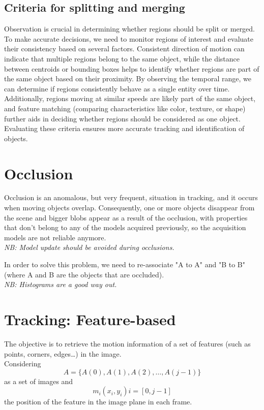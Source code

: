 \subsection{Criteria for splitting and merging}
Observation is crucial in determining whether regions should be split or merged. 
To make accurate decisions, we need to monitor regions of interest and evaluate their consistency based on several factors. 
Consistent direction of motion can indicate that multiple regions belong to the same object, while the distance between centroids or bounding boxes helps to identify whether regions are part of the same object based on their proximity. 
By observing the temporal range, we can determine if regions consistently behave as a single entity over time. 
Additionally, regions moving at similar speeds are likely part of the same object, and feature matching (comparing characteristics like color, texture, or shape) further aids in deciding whether regions should be considered as one object. 
Evaluating these criteria ensures more accurate tracking and identification of objects.

\section{Occlusion}
Occlusion is an anomalous, but very frequent, situation in tracking, and it occurs when moving objects overlap.
Consequently, one or more objects disappear from the scene and bigger blobs appear as a result of the occlusion, with properties that don't belong to any of the models acquired previously, so the acquisition models are not reliable anymore.
\\\textit{NB: Model update should be avoided during occlusions.}

In order to solve this problem, we need to re-associate "A to A" and "B to B" (where A and B are the objects that are occluded). 
\\\textit{NB: Histograms are a good way out.}

\section{Tracking: Feature-based}
The objective is to retrieve the motion information of a set of features (such as points, corners, edges\dots) in the image.
\\Considering
\[A = \{A(0), A(1), A(2), \dots, A(j-1)\}\] as a set of images and
\[m_i(x_i, y_i)i = [0, j-1] \] the position of the feature in the image plane in each frame.


